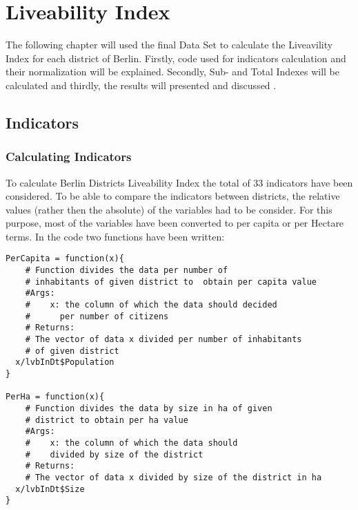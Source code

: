 \newpage
\section{Liveability Index}

The following chapter will used the final Data Set to calculate the Liveavility Index for each district of Berlin. Firstly, code used for indicators calculation and their normalization will be explained. Secondly, Sub- and Total Indexes will be calculated and thirdly, the results will presented and discussed .

\subsection{Indicators}
\subsubsection{Calculating Indicators}
To calculate Berlin Districts Liveability Index the total of 33 indicators have been considered. To be able to compare the indicators between districts, the relative values (rather then the absolute) of the variables had to be consider. For this purpose, most of the variables have been converted to per capita or per Hectare terms. In the code two functions have been written:

\begin{lstlisting}
PerCapita = function(x){
    # Function divides the data per number of 
    # inhabitants of given district to  obtain per capita value 
    #Args: 
    #    x: the column of which the data should decided 
    #      per number of citizens
    # Returns:
    # The vector of data x divided per number of inhabitants
    # of given district
  x/lvbInDt$Population
}

PerHa = function(x){
    # Function divides the data by size in ha of given
    # district to obtain per ha value
    #Args: 
    #    x: the column of which the data should 
    #    divided by size of the district
    # Returns:
    # The vector of data x divided by size of the district in ha
  x/lvbInDt$Size
}

\end{lstlisting}


